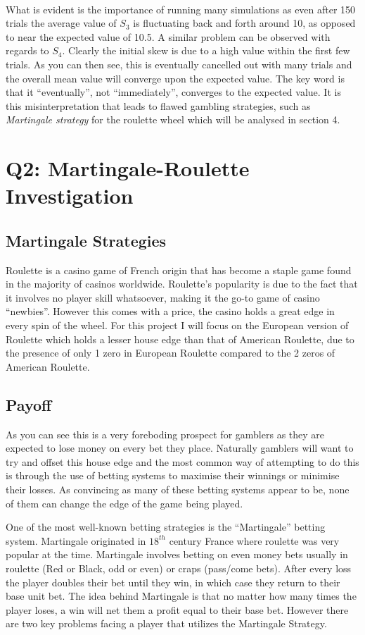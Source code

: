 \documentclass[12pt]{article}
\begin{document}
\\
What is evident is the importance of running many simulations as even after 150 trials the average value of $S_3$ is fluctuating back and forth around 10, as opposed to near the expected value of 10.5. A similar problem can be observed with regards to $S_4$. Clearly the initial skew is due to a high value within the first few trials. As you can then see, this is eventually cancelled out with many trials and the overall mean value will converge upon the expected value. The key word is that it “eventually”, not “immediately”, converges to the expected value. It is this misinterpretation that leads to flawed gambling strategies, such as \emph{Martingale strategy} for the roulette wheel which will be analysed in section 4.

\section{Q2: Martingale-Roulette Investigation}
\subsection{Martingale Strategies}
Roulette is a casino game of French origin that has become a staple game found in the majority of casinos worldwide. Roulette’s popularity is due to the fact that it involves no player skill whatsoever, making it the go-to game of casino “newbies”. However this comes with a price, the casino holds a great edge in every spin of the wheel. For this project I will focus on the European version of Roulette which holds a lesser house edge than that of American Roulette, due to the presence of only 1 zero in European Roulette compared to the 2 zeros of American Roulette.
\subsection{Payoff}
As you can see this is a very foreboding prospect for gamblers as they are expected to lose money on every bet they place. Naturally gamblers will want to try and offset this house edge and the most common way of attempting to do this is through the use of betting systems to maximise their winnings or minimise their losses. As convincing as many of these betting systems appear to be, none of them can change the edge of the game being played.

One of the most well-known betting strategies is the “Martingale” betting system. Martingale originated in $18^{th}$ century France where roulette was very popular at the time. Martingale involves betting on even money bets usually in roulette (Red or Black, odd or even) or craps (pass/come bets). After every loss the player doubles their bet until they win, in which case they return to their base unit bet. The idea behind Martingale is that no matter how many times the player loses, a win will net them a profit equal to their base bet. However there are two key problems facing a player that utilizes the Martingale Strategy.
\end{document}

